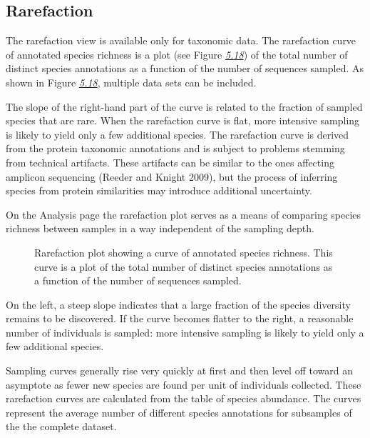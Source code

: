 \documentclass[letterpaper,10pt,english]{sphinxmanual}
\begin{document}
\subsection{Rarefaction}
\label{\detokenize{user_manual:section-analysis-page-rarefaction}}\label{\detokenize{user_manual:id5}}
The rarefaction view is available only for taxonomic data. The
rarefaction curve of annotated species richness is a plot (see Figure
{\hyperref[\detokenize{user_manual:fig:analysis-page-rarefaction-example}]{\emph{5.18}}}) of the total number
of distinct species annotations as a function of the number of sequences
sampled. As shown in Figure
{\hyperref[\detokenize{user_manual:fig:analysis-page-rarefaction-example}]{\emph{5.18}}}, multiple data sets
can be included.

The slope of the right-hand part of the curve is related to the fraction
of sampled species that are rare. When the rarefaction curve is flat,
more intensive sampling is likely to yield only a few additional
species. The rarefaction curve is derived from the protein taxonomic
annotations and is subject to problems stemming from technical
artifacts. These artifacts can be similar to the ones affecting amplicon
sequencing (Reeder and Knight 2009), but the process of inferring
species from protein similarities may introduce additional uncertainty.

On the Analysis page the rarefaction plot serves as a means of comparing
species richness between samples in a way independent of the sampling
depth.

\begin{figure}[htbp]
\centering
\capstart

\noindent{}
\caption{Rarefaction plot showing a curve of annotated species richness. This
curve is a plot of the total number of distinct species annotations
as a function of the number of sequences sampled.}\label{\detokenize{user_manual:fig-analysis-page-rarefaction-example}}\end{figure}

On the left, a steep slope indicates that a large fraction of the
species diversity remains to be discovered. If the curve becomes flatter
to the right, a reasonable number of individuals is sampled: more
intensive sampling is likely to yield only a few additional species.

Sampling curves generally rise very quickly at first and then level off
toward an asymptote as fewer new species are found per unit of
individuals collected. These rarefaction curves are calculated from the
table of species abundance. The curves represent the average number of
different species annotations for subsamples of the the complete
dataset.
\end{document}
